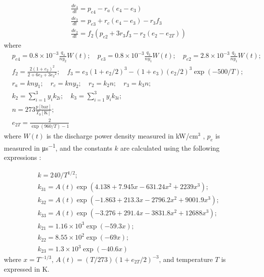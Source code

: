 \begin{equation}\label{eq:dedt}
\begin{aligned}
&\frac{d e_4}{dt} = p_{e4} - r_a (e_4 - e_3)\\
&\frac{d e_3}{dt} = p_{e3} + r_c(e_4 - e_3) - r_3 f_3\\
&\frac{d e_2}{dt} = f_2 \left( p_{e2} + 3 r_3 f_3 - r_2 (e_2 - e_{2T}) \right)
\end{aligned}
\end{equation}
where
\begin{equation}\label{eq:dedt_rates}
\begin{aligned}
&p_{e4} = 0.8\times 10^{-3} \frac{q_4}{n y_2} W(t);\quad p_{e3} = 0.8\times 10^{-3}\frac{q_3}{n y_1} W(t);\quad p_{e2} = 2.8\times 10^{-3}\frac{q_2}{n y_1} W(t);\\
&f_2 = \frac{2(1+e_2)^2}{2+6e_2+3{e_2}^2};\quad f_3 = e_3(1+e_2/2)^3 - (1+e_3)(e_2/2)^3 \exp(- 500/T);\\
&r_a = kny_1;\quad r_c = kny_2;\quad r_2 = k_2n;\quad r_3 = k_3n;\\
&k_2 = \sum\limits_{i=1}^3 y_i k_{2i};\quad k_3 = \sum\limits_{i=1}^3 y_i k_{3i};\\
&n = 273 \frac{p[\text{bar}]}{T_0[\text{K}]};\\
&e_{2T} = \frac{2}{\exp(960/T)-1}
\end{aligned}
\end{equation}
where $W(t)$ is the discharge power density measured in {kW/cm$^3$} , $p_e$ is measured in \si{\micro\second^{-1}}, and the constants $k$ are calculated using the following expressions \cite{Biryukov-1974,Taylor-1969}:

\begin{equation}
\begin{aligned}
&k = 240 / T^{1/2};\\
&k_{31} = A(t)\exp(4.138 + 7.945x - 631.24x^2 + 2239x^3);\\
&k_{32} = A(t)\exp(-1.863 + 213.3x - 2796.2x^2 + 9001.9x^3);\\
&k_{33} = A(t)\exp(-3.276 + 291.4x - 3831.8x^2 + 12688x^3);\\
&k_{21} = 1.16 \times 10^3 \exp(-59.3x);\\
&k_{22} = 8.55 \times 10^2 \exp(-69x);\\
&k_{23} = 1.3 \times 10^3 \exp(-40.6x)
\end{aligned}
\end{equation}
where $x=T^{-1/3}$, $A(t)=(T/273)(1+e_{2T}/2)^{-3}$, and temperature $T$ is expressed in K.

